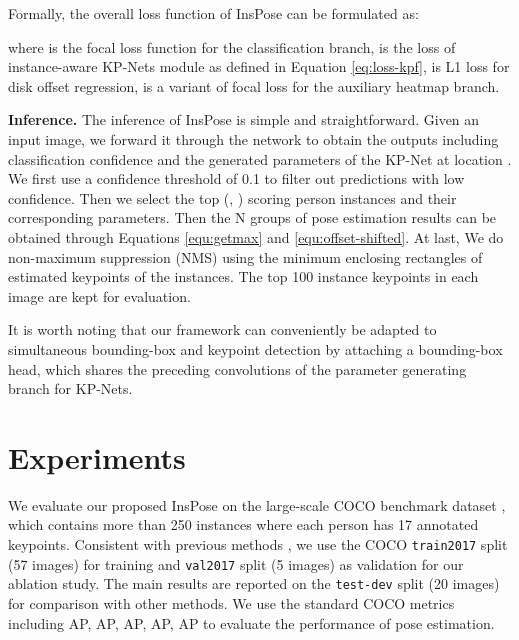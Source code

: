 \documentclass[sigconf]{acmart}
\begin{document}
Formally, the overall loss function of InsPose can be formulated as:

where  is the focal loss function \cite{lin2017focal} for the classification branch,  is the loss of instance-aware KP-Nets module as defined in Equation \eqref{eq:loss-kpf},  is L1 loss for disk offset regression,  is a variant of focal loss \cite{law2018cornernet} for the auxiliary heatmap branch.

\textbf{Inference.}\quad
The inference of InsPose is simple and straightforward. Given an input image, we forward it through the network to obtain the outputs including classification confidence  and the generated parameters  of the KP-Net at location .
We first use a confidence threshold of 0.1 to filter out predictions with low confidence. Then we select the top  (, ) scoring person instances and their corresponding parameters. Then the N groups of pose estimation results can be obtained through Equations \eqref{equ:getmax} and \eqref{equ:offset-shifted}.
At last, We do non-maximum suppression (NMS) using the minimum enclosing rectangles of estimated keypoints of the instances.
The top 100 instance keypoints in each image are kept for evaluation.

It is worth noting that our framework can conveniently be adapted to simultaneous bounding-box and keypoint detection by attaching a  bounding-box head, which shares the preceding convolutions of the parameter generating branch for KP-Nets.


\section{Experiments}
We evaluate our proposed InsPose on the large-scale COCO benchmark dataset \cite{lin2014microsoft}, which contains more than 250 instances where each person has 17 annotated keypoints. Consistent with previous methods \cite{he2017mask, tian2019directpose, wei2020point}, we use the COCO \texttt{train2017} split (57 images) for training and \texttt{val2017} split (5 images) as validation for our ablation study. The main results are reported on the \texttt{test-dev} split (20 images) for comparison with other methods.
We use the standard COCO metrics including AP, AP, AP, AP, AP to evaluate the performance of pose estimation.
\end{document}
